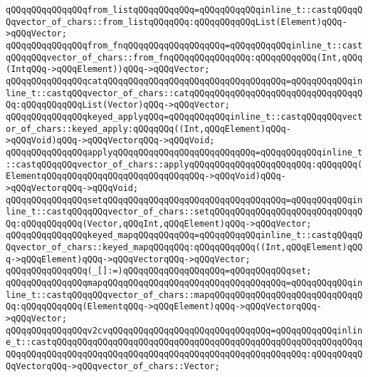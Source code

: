 \newline
\verb|qQQqqQQqqQQqqQQqfrom_listqQQqqQQqqQQq=qQQqqQQqqQQqinline_t::castqQQqqQQqvector_of_chars::from_listqQQqqQQq:qQQqqQQqqQQqList(Element)qQQq->qQQqVector;|\newline
\newline
\verb|qQQqqQQqqQQqqQQqfrom_fnqQQqqQQqqQQqqQQqqQQq=qQQqqQQqqQQqinline_t::castqQQqqQQqvector_of_chars::from_fnqQQqqQQqqQQqqQQq:qQQqqQQqqQQq(Int,qQQq(IntqQQq->qQQqElement))qQQq->qQQqVector;|\newline
\newline
\verb|qQQqqQQqqQQqqQQqcatqQQqqQQqqQQqqQQqqQQqqQQqqQQqqQQqqQQq=qQQqqQQqqQQqinline_t::castqQQqvector_of_chars::catqQQqqQQqqQQqqQQqqQQqqQQqqQQqqQQqqQQq:qQQqqQQqqQQqList(Vector)qQQq->qQQqVector;|\newline
\newline
\verb|qQQqqQQqqQQqqQQqkeyed_applyqQQq=qQQqqQQqqQQqinline_t::castqQQqqQQqvector_of_chars::keyed_apply:qQQqqQQq((Int,qQQqElement)qQQq->qQQqVoid)qQQq->qQQqVectorqQQq->qQQqVoid;|\newline
\verb|qQQqqQQqqQQqqQQqapplyqQQqqQQqqQQqqQQqqQQqqQQqqQQq=qQQqqQQqqQQqinline_t::castqQQqqQQqvector_of_chars::applyqQQqqQQqqQQqqQQqqQQqqQQq:qQQqqQQq(ElementqQQqqQQqqQQqqQQqqQQqqQQqqQQqqQQq->qQQqVoid)qQQq->qQQqVectorqQQq->qQQqVoid;|\newline
\newline
\verb|qQQqqQQqqQQqqQQqsetqQQqqQQqqQQqqQQqqQQqqQQqqQQqqQQqqQQq=qQQqqQQqqQQqinline_t::castqQQqqQQqvector_of_chars::setqQQqqQQqqQQqqQQqqQQqqQQqqQQqqQQq:qQQqqQQqqQQq(Vector,qQQqInt,qQQqElement)qQQq->qQQqVector;|\newline
\verb|qQQqqQQqqQQqqQQqkeyed_mapqQQqqQQqqQQq=qQQqqQQqqQQqinline_t::castqQQqqQQqvector_of_chars::keyed_mapqQQqqQQq:qQQqqQQqqQQq((Int,qQQqElement)qQQq->qQQqElement)qQQq->qQQqVectorqQQq->qQQqVector;|\newline
\newline
\verb|qQQqqQQqqQQqqQQq(_[]:=)qQQqqQQqqQQqqQQqqQQq=qQQqqQQqqQQqset;|\newline
\newline
\verb|qQQqqQQqqQQqqQQqmapqQQqqQQqqQQqqQQqqQQqqQQqqQQqqQQqqQQq=qQQqqQQqqQQqinline_t::castqQQqqQQqvector_of_chars::mapqQQqqQQqqQQqqQQqqQQqqQQqqQQqqQQq:qQQqqQQqqQQq(ElementqQQq->qQQqElement)qQQq->qQQqVectorqQQq->qQQqVector;|\newline
\verb|qQQqqQQqqQQqqQQqv2cvqQQqqQQqqQQqqQQqqQQqqQQqqQQqqQQq=qQQqqQQqqQQqinline_t::castqQQqqQQqqQQqqQQqqQQqqQQqqQQqqQQqqQQqqQQqqQQqqQQqqQQqqQQqqQQqqQQqqQQqqQQqqQQqqQQqqQQqqQQqqQQqqQQqqQQqqQQqqQQqqQQqqQQqqQQq:qQQqqQQqqQQqVectorqQQq->qQQqvector_of_chars::Vector;|\newline
